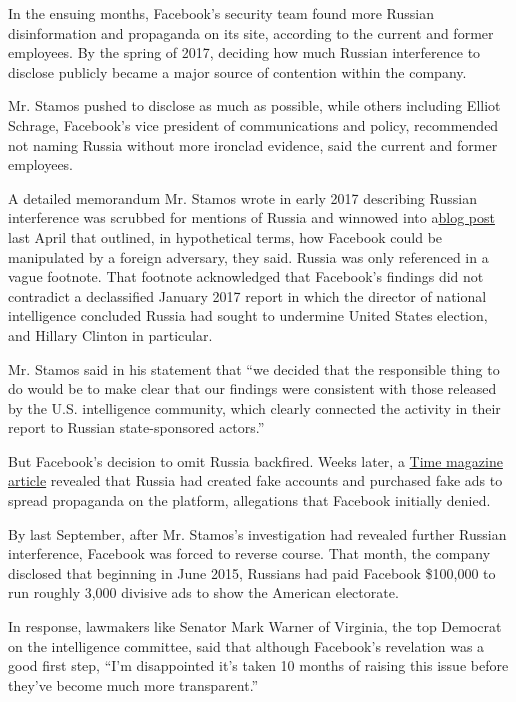 In the ensuing months, Facebook's security team found more Russian
disinformation and propaganda on its site, according to the current and
former employees. By the spring of 2017, deciding how much Russian
interference to disclose publicly became a major source of contention
within the company.

Mr. Stamos pushed to disclose as much as possible, while others
including Elliot Schrage, Facebook's vice president of communications
and policy, recommended not naming Russia without more ironclad
evidence, said the current and former employees.

A detailed memorandum Mr. Stamos wrote in early 2017 describing Russian
interference was scrubbed for mentions of Russia and winnowed into
a\href{https://fbnewsroomus.files.wordpress.com/2017/04/facebook-and-information-operations-v1.pdf}{blog
post} last April that outlined, in hypothetical terms, how Facebook
could be manipulated by a foreign adversary, they said. Russia was only
referenced in a vague footnote. That footnote acknowledged that
Facebook's findings did not contradict a declassified January 2017
report in which the director of national intelligence concluded Russia
had sought to undermine United States election, and Hillary Clinton in
particular.

Mr. Stamos said in his statement that ``we decided that the responsible
thing to do would be to make clear that our findings were consistent
with those released by the U.S. intelligence community, which clearly
connected the activity in their report to Russian state-sponsored
actors.''

But Facebook's decision to omit Russia backfired. Weeks later, a
\href{http://time.com/4783932/inside-russia-social-media-war-america/}{Time
magazine article} revealed that Russia had created fake accounts and
purchased fake ads to spread propaganda on the platform, allegations
that Facebook initially denied.

By last September, after Mr. Stamos's investigation had revealed further
Russian interference, Facebook was forced to reverse course. That month,
the company disclosed that beginning in June 2015, Russians had paid
Facebook \$100,000 to run roughly 3,000 divisive ads to show the
American electorate.

In response, lawmakers like Senator Mark Warner of Virginia, the top
Democrat on the intelligence committee, said that although Facebook's
revelation was a good first step, ``I'm disappointed it's taken 10
months of raising this issue before they've become much more
transparent.''

